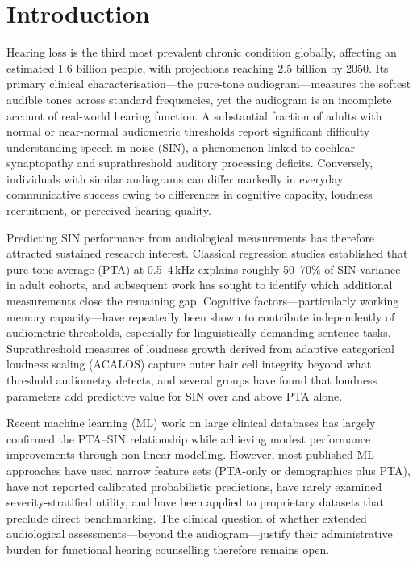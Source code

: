 \documentclass[12pt,a4paper]{article}
\begin{document}
\section{Introduction}

Hearing loss is the third most prevalent chronic condition globally, affecting
an estimated 1.6 billion people, with projections reaching 2.5 billion by
2050\cite{who2021}.  Its primary clinical characterisation---the pure-tone
audiogram---measures the softest audible tones across standard frequencies,
yet the audiogram is an incomplete account of real-world hearing function.
A substantial fraction of adults with normal or near-normal audiometric
thresholds report significant difficulty understanding speech in noise
(SIN)\cite{Plack2014HiddenHL}, a phenomenon linked to cochlear synaptopathy
and suprathreshold auditory processing deficits.  Conversely, individuals
with similar audiograms can differ markedly in everyday communicative success
owing to differences in cognitive capacity, loudness recruitment, or perceived
hearing quality\cite{Gatehouse2004SSQ}.

Predicting SIN performance from audiological measurements has therefore
attracted sustained research interest.  Classical regression studies
established that pure-tone average (PTA) at 0.5--4\,kHz explains roughly
50--70\% of SIN variance in adult cohorts\cite{Smoorenburg1992}, and
subsequent work has sought to identify which additional measurements close
the remaining gap.  Cognitive factors---particularly working memory
capacity---have repeatedly been shown to contribute independently of
audiometric thresholds, especially for linguistically demanding sentence
tasks\cite{Ng2015CognitionSIN,Lunner2003WM}.  Suprathreshold measures of
loudness growth derived from adaptive categorical loudness scaling (ACALOS)
capture outer hair cell integrity beyond what threshold audiometry
detects\cite{Brand2002}, and several groups have found that loudness
parameters add predictive value for SIN over and above PTA alone.

Recent machine learning (ML) work on large clinical databases has largely
confirmed the PTA--SIN relationship while achieving modest performance
improvements through non-linear modelling\cite{Gathman2023}.
However, most published ML approaches have used narrow feature sets
(PTA-only or demographics plus PTA), have not reported calibrated
probabilistic predictions, have rarely examined severity-stratified
utility, and have been applied to proprietary datasets that preclude
direct benchmarking.  The clinical question of whether extended audiological
assessments---beyond the audiogram---justify their administrative burden
for functional hearing counselling therefore remains open.
\end{document}
